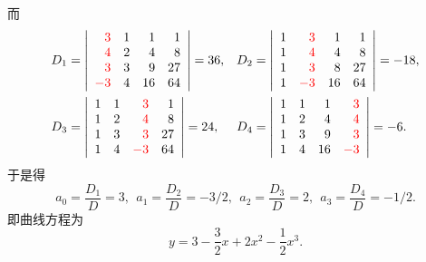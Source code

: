 \begin{frame}
  而
  $$
  \begin{array}{ll}
    D_1 = \left|
    \begin{array}{rrrr}
      \textcolor{red}{3}  &  1 &  1 &  1\\
      \textcolor{red}{4}  &  2 &  4 &  8\\
      \textcolor{red}{3}  &  3 &  9 & 27\\
      \textcolor{red}{-3} &  4 & 16 & 64
    \end{array}
                           \right|= 36, &
                                          D_2 = \left|
                                          \begin{array}{rrrr}
                                            1 & \textcolor{red}{3}  & 1  &  1\\
                                            1 & \textcolor{red}{4}  & 4  &  8\\
                                            1 & \textcolor{red}{3}  & 8  &  27\\
                                            1 & \textcolor{red}{-3} & 16 &  64
                                          \end{array}
                                                                \right|=-18,\\[0.8cm]
    D_3 = \left|
    \begin{array}{rrrr}
      1 & 1 & \textcolor{red}{3}  &  1 \\
      1 & 2 & \textcolor{red}{4}  &  8 \\
      1 & 3 & \textcolor{red}{3}  & 27 \\
      1 & 4 & \textcolor{red}{-3} & 64
    \end{array}
                         \right|= 24, &
                                        D_4 = \left|
                                        \begin{array}{rrrr}
                                          1 & 1 &  1 & \textcolor{red}{3} \\
                                          1 & 2 &  4 & \textcolor{red}{4} \\
                                          1 & 3 &  9 & \textcolor{red}{3} \\
                                          1 & 4 & 16 & \textcolor{red}{-3}
                                        \end{array}
                                                       \right|= -6.
  \end{array}
  $$
  于是得
  $$
  a_0 = \frac{D_1}D = 3,  \ \ 
  a_1 = \frac{D_2}D = -3/2, \ \ 
  a_2 = \frac{D_3}D = 2, \ \ 
  a_3 = \frac{D_4}D = -1/2.
  $$
  即曲线方程为
  $$
  y = 3 - \frac 32 x + 2 x^2 - \frac 12 x^3.
  $$

\end{frame}
